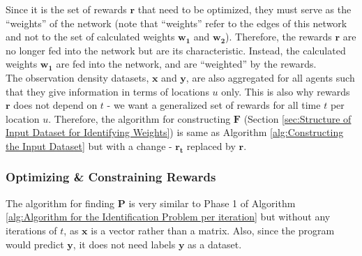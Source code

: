\documentclass[12pt]{article}
\newcommand{\vect}[1]{\mathbf{#1}}  %
\newcommand{\matr}[1]{\mathbf{#1}}  %
\begin{document}
    Since it is the set of rewards $\vect{r}$ that need to be optimized, they must serve as the ``weights'' of the network (note that ``weights'' refer to the edges of this network and not to the set of calculated weights $\matr{w_1}$ and $\matr{w_2}$). Therefore, the rewards $\vect{r}$ are no longer fed into the network but are its characteristic. Instead, the calculated weights $\matr{w_1}$ are fed into the network, and are ``weighted'' by the rewards.\\
    
    The observation density datasets, $\matr{x}$ and $\matr{y}$, are also aggregated for all agents such that they give information in terms of locations $u$ only. This is also why rewards $\vect{r}$ does not depend on $t$ - we want a generalized set of rewards for all time $t$ per location $u$. Therefore, the algorithm for constructing $\matr{F}$ (Section \ref{sec:Structure of Input Dataset for Identifying Weights}) is same as Algorithm \ref{alg:Constructing the Input Dataset} but with a change - $\vect{r_t}$ replaced by $\vect{r}$.
    
    \subsubsection{Optimizing \& Constraining Rewards} \label{sec:Optimizing and Constraining Rewards}
    The algorithm for finding $\matr{P}$ is very similar to Phase 1 of Algorithm \ref{alg:Algorithm for the Identification Problem per iteration} but without any iterations of $t$, as $\vect{x}$ is a vector rather than a matrix. Also, since the program would predict $\vect{y}$, it does not need labels $\vect{y}$ as a dataset.\\
    
\end{document}
